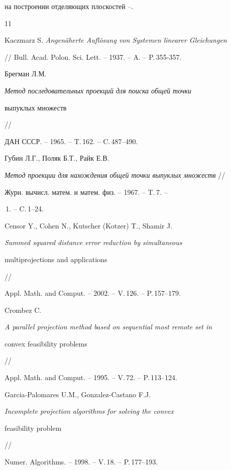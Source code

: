 на построении отделяющих плоскостей \cite{sonn}--\cite{kiw}.





\begin{thebibliography}{11}







Kaczmarz S. {\em Angen\"aherte Aufl\"osung von Systemen linearer Gleichungen}


// Bull. Acad. Polon. Sci. Lett. -- 1937. -- A. -- P.\,355-357.




Брегман Л.М.


{\em Метод последовательных проекций для поиска общей точки


выпуклых множеств} //


ДАН СССР. -- 1965. -- T.\,162. -- C.\,487--490.




Губин Л.Г., Поляк Б.Т., Райк Е.В.


{\em Метод проекции для нахождения общей точки выпуклых множеств} //


Журн. вычисл. матем. и  матем. физ. -- 1967. -- T.\,7. --


\No\,1. -- C.\,1--24.




Censor Y., Cohen N., Kutscher (Kotzer) T., Shamir J.


{\em Summed squared distance error reduction by simultaneous


multiprojections and applications} //


Appl. Math. and Comput. -- 2002. -- V.\,126. -- P.\,157--179.




Crombez C.


{\em A parallel projection method based on sequential most remote set in


convex feasibility problems} // 


Appl. Math. and Comput. -- 1995. -- V.\,72. -- P.\,113--124.




Garcia-Palomares U.M., Gonzalez-Castano F.J. 


{\em Incomplete projection algorithms for solving the convex


feasibility problem} // 


Numer. Algorithms. -- 1998. -- V.\,18. -- P.\,177--193.



\end{thebibliography}
